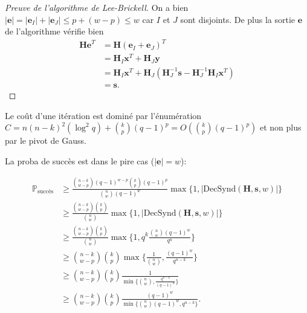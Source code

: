 \documentclass{scrartcl}[a4paper,10pt,headings=small,footinclude=false]
\theoremstyle{definition}
\theoremstyle{remark}
\begin{document}
\begin{proof}[Preuve de l'algorithme de Lee-Brickell]
On a bien $|\textbf{e}|=|\textbf{e}_I|+|\textbf{e}_J|\leq p + (w - p)\leq w$ car $I$ et $J$ sont disjoints.
De plus la sortie $\textbf{e}$ de l'algorithme vérifie bien
\begin{align*}
    \textbf{He}^T &= \textbf{H}(\textbf{e}_I+\textbf{e}_J)^T\\
    &= \textbf{H}_I \textbf{x}^T + \textbf{H}_J \textbf{y}\\
    &= \textbf{H}_I \textbf{x}^T + \textbf{H}_J (\textbf{H}_J^{-1}\textbf{s} - \textbf{H}_J^{-1}\textbf{H}_I\textbf{x}^T)\\
    &= \textbf{s}.
\end{align*}
\end{proof}

Le coût d'une itération est dominé par l'énumération $C=n(n-k)^2(\log^2 q) + \binom{k}{p}(q-1)^p=O(\binom{k}{p}(q-1)^p)$ et non plus par le pivot de Gauss. 


La proba de succès est dans le pire cas ($|\textbf{e}|=w$):

\begin{align*}
\mathbb{P}_{\text{succès}} &\geq  \frac{\binom{n-k}{w-p}(q-1)^{w-p} \binom{k}{p}(q-1)^{p}}{\binom{n}{w}(q-1)^w} \max \{ 1, |\text{DecSynd}(\textbf{H},\textbf{s},w)|\}\\
&\geq  \frac{\binom{n-k}{w-p} \binom{k}{p}}{\binom{n}{w}} \max \{ 1, |\text{DecSynd}(\textbf{H},\textbf{s},w)|\}\\
&\geq  \frac{\binom{n-k}{w-p} \binom{k}{p}}{\binom{n}{w}} \max \{ 1, q^k \frac{\binom{n}{w}(q-1)^w}{q^n}\}\\
&\geq  \binom{n-k}{w-p} \binom{k}{p} \max \{ \frac{1}{\binom{n}{w}}, \frac{(q-1)^w}{q^{n-k}}\}\\
&\geq  \binom{n-k}{w-p} \binom{k}{p} \frac{1}{\min \{ \binom{n}{w}, \frac{q^{n-k}}{(q-1)^w}\}}\\
&\geq  \binom{n-k}{w-p} \binom{k}{p} \frac{(q-1)^w}{\min \{ \binom{n}{w}(q-1)^w, q^{n-k}\}}.
\end{align*}
\end{document}
